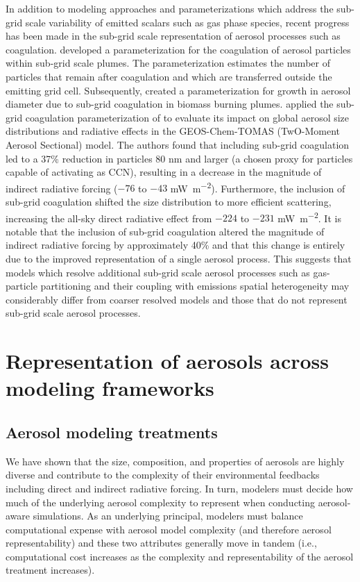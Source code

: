 In addition to modeling approaches and parameterizations which address the sub-grid scale variability of emitted scalars such as gas phase species, recent progress has been made in the sub-grid scale representation of aerosol processes such as coagulation. \textcite{pierce_parameterization_2009} developed a parameterization for the coagulation of aerosol particles within sub-grid scale plumes. The parameterization estimates the number of particles that remain after coagulation and which are transferred outside the emitting grid cell. Subsequently, \textcite{sakamoto_evolution_2016} created a parameterization for growth in aerosol diameter due to sub-grid coagulation in biomass burning plumes. \textcite{ramnarine_effects_2019} applied the sub-grid coagulation parameterization of \textcite{sakamoto_evolution_2016} to evaluate its impact on global aerosol size distributions and radiative effects in the GEOS-Chem-TOMAS (TwO-Moment Aerosol Sectional) model. The authors found that including sub-grid coagulation led to a 37\% reduction in particles 80 nm and larger (a chosen proxy for particles capable of activating as CCN), resulting in a decrease in the magnitude of indirect radiative forcing ($-76$ to $-43$ \si{mW.m^{-2}}). Furthermore, the inclusion of sub-grid coagulation shifted the size distribution to more efficient scattering, increasing the all-sky direct radiative effect from $-224$ to $-231$ \si{mW.m^{-2}}. It is notable that the inclusion of sub-grid coagulation altered the magnitude of indirect radiative forcing by approximately 40\% and that this change is entirely due to the improved representation of a single aerosol process. This suggests that models which resolve additional sub-grid scale aerosol processes such as gas-particle partitioning and their coupling with emissions spatial heterogeneity may considerably differ from coarser resolved models and those that do not represent sub-grid scale aerosol processes. 


\section{Representation of aerosols across modeling frameworks}\label{aerosol_model_treatments} 

\subsection{Aerosol modeling treatments}

We have shown that the size, composition, and properties of aerosols are highly diverse and contribute to the complexity of their environmental feedbacks including direct and indirect radiative forcing. In turn, modelers must decide how much of the underlying aerosol complexity to represent when conducting aerosol-aware simulations. As an underlying principal, modelers must balance computational expense with aerosol model complexity (and therefore aerosol representability) and these two attributes generally move in tandem (i.e., computational cost increases as the complexity and representability of the aerosol treatment increases). 

